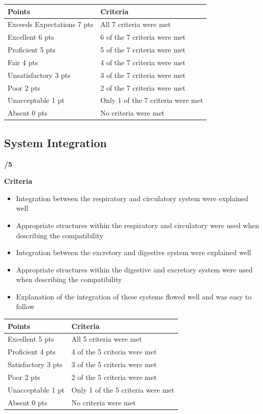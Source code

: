 \documentclass[
]{book}
\providecommand{\tightlist}{%
  \setlength{\itemsep}{0pt}\setlength{\parskip}{0pt}}
\begin{document}
\begin{longtable}[]{@{}ll@{}}
\toprule()
Points & Criteria \\
\midrule()
\endhead
Exceeds Expectations 7 pts & All 7 criteria were met \\
Excellent 6 pts & 6 of the 7 criteria were met \\
Proficient 5 pts & 5 of the 7 criteria were met \\
Fair 4 pts & 4 of the 7 criteria were met \\
Unsatisfactory 3 pts & 3 of the 7 criteria were met \\
Poor 2 pts & 2 of the 7 criteria were met \\
Unacceptable 1 pt & Only 1 of the 7 criteria were met \\
Absent 0 pts & No criteria were met \\
\bottomrule()
\end{longtable}

\hypertarget{system-integration}{%
\subsection*{System Integration}\label{system-integration}}

\textbf{/5}

\textbf{Criteria}

\begin{itemize}
\tightlist
\item
  Integration between the respiratory and circulatory system were explained well
\item
  Appropriate structures within the respiratory and circulatory were used when describing the compatibility
\item
  Integration between the excretory and digestive system were explained well
\item
  Appropriate structures within the digestive and excretory system were used when describing the compatibility
\item
  Explanation of the integration of these systems flowed well and was easy to follow
\end{itemize}

\begin{longtable}[]{@{}ll@{}}
\toprule()
Points & Criteria \\
\midrule()
\endhead
Excellent 5 pts & All 5 criteria were met \\
Proficient 4 pts & 4 of the 5 criteria were met \\
Satisfactory 3 pts & 3 of the 5 criteria were met \\
Poor 2 pts & 2 of the 5 criteria were met \\
Unacceptable 1 pt & Only 1 of the 5 criteria were met \\
Absent 0 pts & No criteria were met \\
\bottomrule()
\end{longtable}
\end{document}
